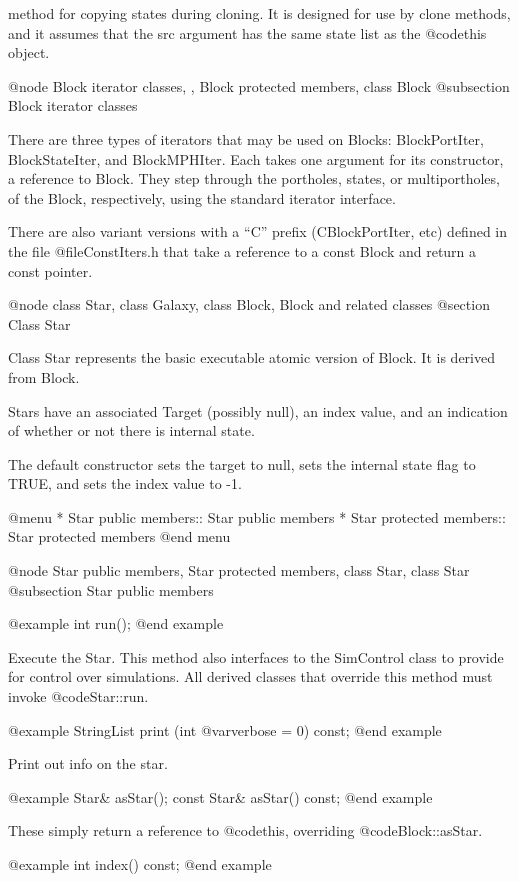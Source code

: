 method for copying states during cloning.  It is designed for use
by clone methods, and it assumes that the src argument has the same
state list as the @code{this} object.

@node Block iterator classes,  , Block protected members, class Block
@subsection Block iterator classes

There are three types of iterators that may be used on Blocks:
BlockPortIter, BlockStateIter, and BlockMPHIter.
Each takes one argument for its constructor, a reference to Block.
They step through the portholes, states, or multiportholes, of the
Block, respectively, using the standard iterator interface.

There are also variant versions with a ``C'' prefix (CBlockPortIter, etc)
defined in the file @file{ConstIters.h} that take a reference to a const Block
and return a const pointer.

@node class Star, class Galaxy, class Block, Block and related classes
@section Class Star

Class Star represents the basic executable atomic version of Block.
It is derived from Block.

Stars have an associated Target (possibly null), an index value,
and an indication of whether or not there is internal state.

The default constructor sets the target to null, sets the internal
state flag to TRUE, and sets the index value to -1.

@menu
* Star public members::         Star public members
* Star protected members::      Star protected members
@end menu

@node Star public members, Star protected members, class Star, class Star
@subsection Star public members

@example
int run();
@end example

Execute the Star.  This method also interfaces to the SimControl
class to provide for control over simulations.  All derived classes
that override this method must invoke @code{Star::run}.

@example
StringList print (int @var{verbose} = 0) const;
@end example

Print out info on the star.

@example
Star& asStar();
const Star& asStar() const;
@end example

These simply return a reference to @code{this}, overriding @code{Block::asStar}.

@example
int index() const;
@end example

